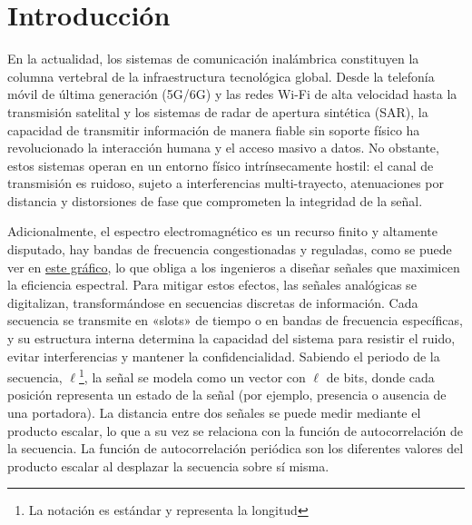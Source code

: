 \documentclass[12pt,a4paper]{tfg_domingo}
\begin{document}

\portada
\frontmatter
\gracias{}
\resumen{}{}
\tableofcontents

\mainmatter

\chapter{Introducción}
\label{cap:introduccion}
En la actualidad, los sistemas de comunicación inalámbrica constituyen
la columna vertebral de la infraestructura tecnológica global. Desde
la telefonía móvil de última generación (5G/6G) y las redes Wi-Fi de
alta velocidad hasta la transmisión satelital y los sistemas de radar
de apertura sintética (SAR), la capacidad de transmitir información de
manera fiable sin soporte físico ha revolucionado la interacción
humana y el acceso masivo a datos. No obstante, estos sistemas operan
en un entorno físico intrínsecamente hostil: el canal de transmisión
es ruidoso, sujeto a interferencias multi-trayecto, atenuaciones por
distancia y distorsiones de fase que comprometen la integridad de la
señal. 

Adicionalmente, el espectro electromagnético es un recurso finito y
altamente disputado, hay bandas de frecuencia congestionadas y
reguladas, como se puede ver en  \href{https://avance.digital.gob.es/espectro/Documents/Poster-CNAF.pdf}{este gráfico}, lo que obliga a los ingenieros a diseñar señales que
maximicen la eficiencia espectral. 
Para mitigar estos efectos, las
señales analógicas se digitalizan, transformándose en secuencias
discretas de información. Cada secuencia se transmite en «slots» de
tiempo o en bandas de frecuencia específicas, y su estructura interna
determina la capacidad del sistema para resistir el ruido, evitar
interferencias y mantener la confidencialidad.
Sabiendo el periodo de la secuencia, $\ell$\footnote{La notación es
  estándar y representa la longitud}, la señal se modela como un
vector con $\ell$ de bits, donde cada posición representa un estado de la señal
(por ejemplo, presencia o ausencia de una portadora). La distancia
entre dos señales se puede medir mediante el producto escalar, lo que
a su vez se relaciona con la función de autocorrelación de la
secuencia. La función de autocorrelación periódica son los diferentes
valores del producto escalar al desplazar la secuencia sobre sí
misma.
\end{document}

